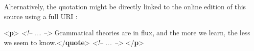 Alternatively, the quotation might be directly linked to the online edition of this source using a full URI : \par\bgroup{}\exampleFont \begin{shaded}\noindent\mbox{}{<\textbf{p}>}\mbox{}\newline 
\textit{<!-- ... -->}\mbox{}\newline 
{}Grammatical theories\mbox{}\newline 
\hspace*{1em}\hspace*{1em} are in flux, and the more we learn, the less we\mbox{}\newline 
\hspace*{1em}\hspace*{1em} seem to know.{</\textbf{quote}>}\mbox{}\newline 
\textit{<!-- ... -->}\mbox{}\newline 
{</\textbf{p}>}\end{shaded}\egroup\par \noindent  \par
